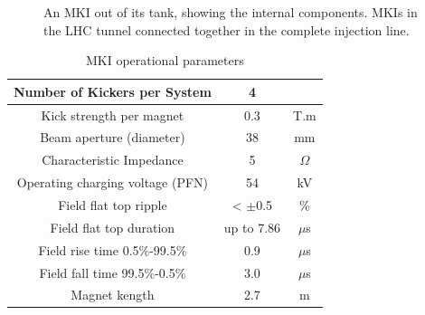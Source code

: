 \begin{figure}
\begin{center}
\end{center}
\caption{ An MKI out of its tank, showing the internal components.  MKIs in the LHC tunnel connected together in the complete injection line.}
\label{fig:lhc-mki-cross-section}
\end{figure}

\begin{table}
\caption{MKI operational parameters}

\begin{center}
\begin{tabular}{c | c | c}
Number of Kickers per System & 4 & \\ \hline
Kick strength per magnet & 0.3 & T.m \\ \hline
Beam aperture (diameter) & 38 & mm \\ \hline
Characteristic Impedance & 5 & $\Omega$ \\ \hline
Operating charging voltage (PFN) & 54 & kV \\ \hline
Field flat top ripple & < $\pm$0.5 & \% \\ \hline
Field flat top duration & up to 7.86 & $\mu$s \\ \hline
Field rise time 0.5\%-99.5\% & 0.9 & $\mu$s \\ \hline
Field fall time 99.5\%-0.5\% & 3.0 & $\mu$s \\ \hline
Magnet kength & 2.7 & m \\ 
\end{tabular}
\end{center}
\label{tab:mki-parameters}
\end{table}